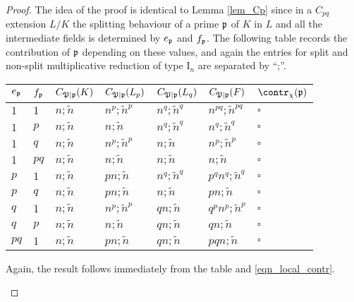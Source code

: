 \begin{proof}
    The idea of the proof is identical to Lemma \ref*{lem_Cp} since in a $C_{pq}$ extension $L/K$ the splitting behaviour of a prime $\pp$ of $K$ in $L$ and all the intermediate fields is determined by $e_\pp$ and $f_\pp$. The following table records the contribution of $\pp$ depending on these values, and again the entries for split and non-split multiplicative reduction of type $\mathrm{I}_n$ are separated by ``;''.

    \begin{table}[!ht]
        \centering
        \begin{tabular}{|l|l|l|l|l|l|l|}
        \hline
        $e_\pp$ & $f_\pp$  & $C_{\mathfrak{P}\mid \pp}(K)$ & $C_{\mathfrak{P}\mid \pp}(L_p)$ & $C_{\mathfrak{P}\mid \pp}(L_q)$ & $C_{\mathfrak{P}\mid \pp}(F)$ & $\contr_\chi(\pp)$ \\ \hline
        $1$ & $1$ & $n;\tilde{n}$ & $n^p;\tilde{n}^p$ & $n^q;\tilde{n}^q$ & $n^{pq};\tilde{n}^{pq}$ & $\square$ \\ \hline
        $1$ & $p$ & $n;\tilde{n}$ & $n;\tilde{n}$ & $n^q;\tilde{n}^q$ & $n^q;\tilde{n}^q$ & $\square$ \\ \hline
        $1$ & $q$ & $n;\tilde{n}$ & $n^p;\tilde{n}^p$ & $n;\tilde{n}$ & $n^p;\tilde{n}^p$ & $\square$ \\ \hline
        $1$ & $pq$ & $n;\tilde{n}$ & $n;\tilde{n}$ & $n;\tilde{n}$ & $n;\tilde{n}$ & $\square$ \\ \hline
        $p$ & $1$ & $n;\tilde{n}$ & $pn;\tilde{n}$ & $n^q;\tilde{n}^q$ & $p^qn^q;\tilde{n}^q$ & $\square$ \\ \hline
        $p$ & $q$ & $n;\tilde{n}$ & $pn;\tilde{n}$ & $n;\tilde{n}$ & $pn;\tilde{n}$ & $\square$ \\ \hline
        $q$ & $1$ & $n;\tilde{n}$ & $n^p;\tilde{n}^p$ & $qn;\tilde{n}$ & $q^pn^p;\tilde{n}^p$ & $\square$ \\ \hline
        $q$ & $p$ & $n;\tilde{n}$ & $n;\tilde{n}$ & $qn;\tilde{n}$ & $qn;\tilde{n}$ & $\square$ \\ \hline
        $pq$ & $1$ & $n;\tilde{n}$ & $pn;\tilde{n}$ & $qn;\tilde{n}$ & $pqn;\tilde{n}$ & $\square$ \\ \hline
        \end{tabular}
    \end{table}
Again, the result follows immediately from the table and \eqref{eqn_local_contr}.
    \begin{figure}[!ht]
        \centering
        \begin{tikzpicture}


\end{tikzpicture}
\end{figure}
\end{proof}

